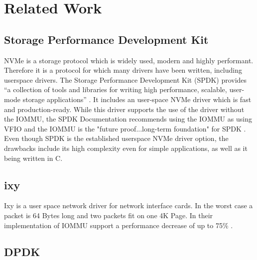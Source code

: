 \chapter{Related Work}

\section{Storage Performance Development Kit}
NVMe is a storage protocol which is widely used, modern and highly performant. Therefore it is a protocol for which many drivers have been written, including userspace drivers. The Storage Performance Development Kit (SPDK) provides ``a collection of tools and libraries for writing high performance, scalable, user-mode storage applications'' \cite{spdkindex}. It includes an user-space NVMe driver which is fast and production-ready. While this driver supports the use of the driver without the IOMMU, the SPDK Documentation recommends using the IOMMU as using VFIO and the IOMMU is the "future proof...long-term foundation" for SPDK \cite{spdkmemory}. Even though SPDK is the established userspace NVMe driver option, the drawbacks include its high complexity even for simple applications, as well as it being written in C.

\section{ixy} \label{s:ixy}
Ixy is a user space network driver for network interface cards. In the worst case a packet is 64 Bytes long and two packets fit on one 4K Page. In their implementation of IOMMU support a performance decrease of up to 75\% \cite{iommuhuber}.

\section{DPDK}